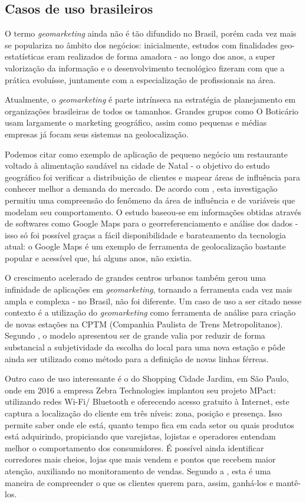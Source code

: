 \subsection{Casos de uso brasileiros}

O termo \emph{geomarketing} ainda não é tão difundido no Brasil, porém cada
vez mais se populariza no âmbito dos negócios: inicialmente, estudos com finalidades geo-estatísticas eram realizados de forma amadora - ao longo dos anos, a super valorização da informação e o desenvolvimento tecnológico fizeram com que a prática evoluísse, juntamente com a especialização de profissionais na área.

Atualmente, o \emph{geomarketing} é parte intrínseca na estratégia de planejamento em organizações brasileiras de todos os tamanhos. Grandes grupos como O Boticário usam largamente o marketing geográfico, assim como pequenas e médias empresas já focam seus sistemas na geolocalização. 

Podemos citar como exemplo de aplicação de pequeno negócio um restaurante voltado à alimentação saudável na cidade de Natal - o objetivo do estudo geográfico foi verificar a distribuição de clientes e
mapear áreas de influência para conhecer melhor a demanda do mercado. De acordo
com , esta investigação permitiu uma compreensão do
fenômeno da área de influência e de variáveis que modelam seu comportamento. O
estudo baseou-se em informações obtidas através de softwares como Google
Maps para o georreferenciamento e análise dos dados - isso só foi possível
graças a fácil disponibilidade e barateamento da tecnologia atual: o
Google Maps é um exemplo de ferramenta de geolocalização bastante popular
e acessível que, há alguns anos, não existia.

O crescimento acelerado de grandes centros urbanos também gerou uma infinidade de aplicações em \emph{geomarketing}, tornando a ferramenta cada vez mais ampla e
complexa - no Brasil, não foi diferente. Um caso de uso a ser citado nesse contexto é a utilização do
\emph{geomarketing} como ferramenta de análise para criação de novas estações na
CPTM (Companhia Paulista de Trens Metropolitanos). Segundo
, o modelo apresentou ser de grande valia por reduzir de
forma substancial a subjetividade da escolha do local para uma nova estação e
pôde ainda ser utilizado como método para a definição de novas linhas férreas.

Outro caso de uso interessante é o do Shopping Cidade Jardim, em São Paulo, onde em 2016 a empresa Zebra Technologies implantou seu projeto MPact: utilizando redes Wi-Fi/ Bluetooth e oferecendo acesso gratuito à Internet, este captura a localização do cliente em três níveis: zona, posição e presença. Isso permite saber onde ele está, quanto tempo fica em cada setor ou quais produtos está adquirindo, propiciando que varejistas, lojistas e operadores entendam melhor o comportamento dos consumidores. É possível ainda identificar corredores mais cheios, lojas que mais vendem e pontos que recebem maior atenção, auxiliando no monitoramento de vendas. Segundo a , esta é uma maneira de compreender o que os clientes querem para, assim, ganhá-los e mantê-los.

